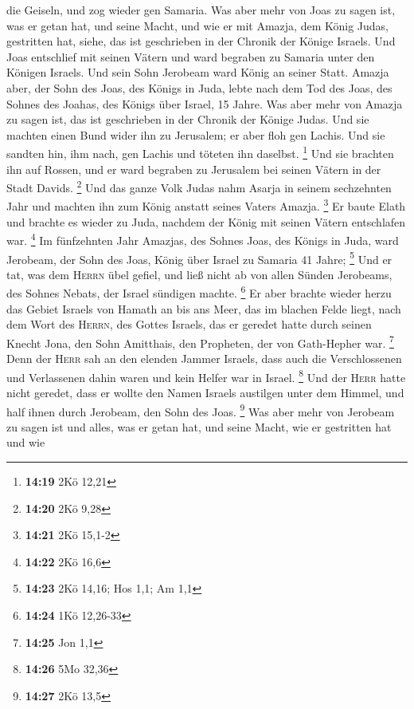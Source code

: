 die Geiseln, und zog wieder gen Samaria.  Was aber mehr
von Joas zu sagen ist, was er getan hat, und seine Macht, und wie er mit
Amazja, dem König Judas, gestritten hat, siehe, das ist geschrieben in
der Chronik der Könige Israels.  Und Joas entschlief mit
seinen Vätern und ward begraben zu Samaria unter den Königen Israels.
Und sein Sohn Jerobeam ward König an seiner Statt. 
Amazja aber, der Sohn des Joas, des Königs in Juda, lebte nach dem Tod
des Joas, des Sohnes des Joahas, des Königs über Israel, 15 Jahre.
 Was aber mehr von Amazja zu sagen ist, das ist
geschrieben in der Chronik der Könige Judas.  Und sie
machten einen Bund wider ihn zu Jerusalem; er aber floh gen Lachis. Und
sie sandten hin, ihm nach, gen Lachis und töteten ihn daselbst.
\footnote{\textbf{14:19} 2Kö 12,21}  Und sie brachten ihn
auf Rossen, und er ward begraben zu Jerusalem bei seinen Vätern in der
Stadt Davids. \footnote{\textbf{14:20} 2Kö 9,28}  Und das
ganze Volk Judas nahm Asarja in seinem sechzehnten Jahr und machten ihn
zum König anstatt seines Vaters Amazja. \footnote{\textbf{14:21} 2Kö
  15,1-2}  Er baute Elath und brachte es wieder zu Juda,
nachdem der König mit seinen Vätern entschlafen war. \footnote{\textbf{14:22}
  2Kö 16,6}  Im fünfzehnten Jahr Amazjas, des Sohnes
Joas, des Königs in Juda, ward Jerobeam, der Sohn des Joas, König über
Israel zu Samaria 41 Jahre; \footnote{\textbf{14:23} 2Kö 14,16; Hos 1,1;
  Am 1,1}  Und er tat, was dem \textsc{Herrn} übel
gefiel, und ließ nicht ab von allen Sünden Jerobeams, des Sohnes Nebats,
der Israel sündigen machte. \footnote{\textbf{14:24} 1Kö 12,26-33}
 Er aber brachte wieder herzu das Gebiet Israels von
Hamath an bis ans Meer, das im blachen Felde liegt, nach dem Wort des
\textsc{Herrn}, des Gottes Israels, das er geredet hatte durch seinen
Knecht Jona, den Sohn Amitthais, den Propheten, der von Gath-Hepher war.
\footnote{\textbf{14:25} Jon 1,1}  Denn der \textsc{Herr}
sah an den elenden Jammer Israels, dass auch die Verschlossenen und
Verlassenen dahin waren und kein Helfer war in Israel. \footnote{\textbf{14:26}
  5Mo 32,36}  Und der \textsc{Herr} hatte nicht geredet,
dass er wollte den Namen Israels austilgen unter dem Himmel, und half
ihnen durch Jerobeam, den Sohn des Joas. \footnote{\textbf{14:27} 2Kö
  13,5}  Was aber mehr von Jerobeam zu sagen ist und
alles, was er getan hat, und seine Macht, wie er gestritten hat und wie
